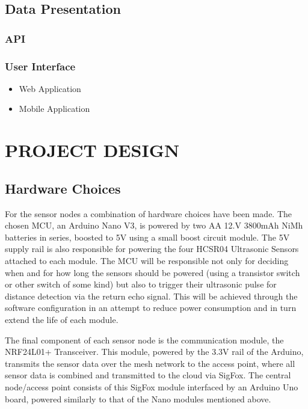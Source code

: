 \documentclass[10pt,twocolumn]{witseiepaper}
\begin{document}
	\subsection{Data Presentation}
		\subsubsection{API}
		\subsubsection{User Interface}
			\begin{itemize}
				\item Web Application
				\item Mobile Application
			\end{itemize}

\section{PROJECT DESIGN}
	\subsection{Hardware Choices}
	
		For the sensor nodes a combination of hardware choices have been made. The chosen MCU, an Arduino Nano V3, is powered by two AA 12.V 3800mAh NiMh batteries in series, boosted to 5V using a small boost circuit module. The 5V supply rail is also responsible for powering the four HCSR04 Ultrasonic Sensors attached to each module. The MCU will be responsible not only for deciding when and for how long the sensors should be powered (using a transistor switch or other switch of some kind) but also to trigger their ultrasonic pulse for distance detection via the return echo signal. This will be achieved through the software configuration in an attempt to reduce power consumption and in turn extend the life of each module. 
		
		The final component of each sensor node is the communication module, the NRF24L01+ Transceiver. This module, powered by the 3.3V rail of the Arduino, transmits the sensor data over the mesh network to the access point, where all sensor data is combined and transmitted to the cloud via SigFox. The central node/access point consists of this SigFox module interfaced by an Arduino Uno board, powered similarly to that of the Nano modules mentioned above.
	
\end{document}
